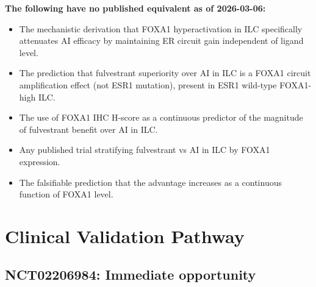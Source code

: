 \documentclass[12pt, a4paper]{article}
\begin{document}
\begin{center}
\colorbox{novelbox}{
\begin{minipage}{0.88\textwidth}
\vspace{0.5em}
\textbf{The following have no published equivalent
as of 2026-03-06:}
\begin{itemize}[noitemsep]
    \item The mechanistic derivation that FOXA1
    hyperactivation in ILC specifically attenuates
    AI efficacy by maintaining ER circuit gain
    independent of ligand level.
    \item The prediction that fulvestrant
    superiority over AI in ILC is a FOXA1
    circuit amplification effect (not ESR1
    mutation), present in ESR1 wild-type
    FOXA1-high ILC.
    \item The use of FOXA1 IHC H-score as a
    continuous predictor of the magnitude of
    fulvestrant benefit over AI in ILC.
    \item Any published trial stratifying
    fulvestrant vs AI in ILC by FOXA1 expression.
    \item The falsifiable prediction that the
    advantage increases as a continuous function
    of FOXA1 level.
\end{itemize}
\vspace{0.5em}
\end{minipage}}
\end{center}

\section{Clinical Validation Pathway}

\subsection{NCT02206984: Immediate opportunity}
\end{document}
